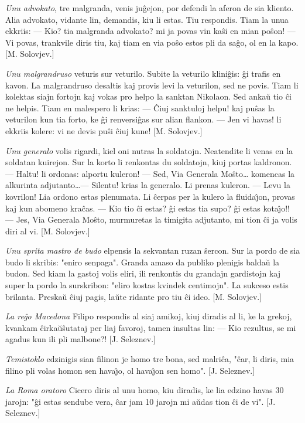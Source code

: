 \emph{Unu advokato}, tre malgranda, venis ju\^gejon, por defendi la
aferon de sia kliento. Alia advokato, vidante lin, demandis, kiu li
estas. Tiu respondis. Tiam la unua ekkriis: --- Kio? tia malgranda
advokato? mi ja povas vin ka\^si en mian po\^son! --- Vi povas,
trankvile diris tiu, kaj tiam en via po\^so estos pli da sa\^go, ol
en la kapo. [M. Solovjev.]

\emph{Unu malgrandruso} veturis sur veturilo. Subite la veturilo
klini\^gis: \^gi trafis en kavon. La malgrandruso desaltis kaj
provis levi la veturilon, sed ne povis. Tiam li kolektas siajn
fortojn kaj vokas pro helpo la sanktan Nikolaon. Sed anka\u u tio
\^ci ne helpis. Tiam en malespero li krias: --- \^Ciuj sanktuloj
helpu! kaj pu\^sas la veturilon kun tia forto, ke \^gi renversi\^gas
sur alian flankon. --- Jen vi havas! li ekkriis kolere: vi ne devis
pu\^si \^ciuj kune! [M. Solovjev.]

\emph{Unu generalo} volis rigardi, kiel oni nutras la soldatojn.
Neatendite li venas en la soldatan kuirejon. Sur la korto li
renkontas du soldatojn, kiuj portas kaldronon. --- Haltu! li
ordonas: alportu kuleron! --- Sed, Via Generala Mo\^sto\dots
komencas la alkurinta adjutanto\dots --- Silentu! krias la generalo.
Li prenas kuleron. --- Levu la kovrilon! Lia ordono estas plenumata.
Li \^cerpas per la kulero la fluida\^{\j}on, provas kaj kun abomeno
kra\^cas. --- Kio tio \^ci estas? \^gi estas tia supo? \^gi estas
kota\^{\j}o!! --- Jes, Via Generala Mo\^sto, murmuretas la timigita
adjutanto, mi tion \^ci ja volis diri al vi. [M. Solovjev.]

\emph{Unu sprita mastro de budo} elpensis la sekvantan ruzan
\^sercon. Sur la pordo de sia budo li skribis: "eniro senpaga".
Granda amaso da publiko plenigis balda\u u la budon. Sed kiam la
gastoj volis eliri, ili renkontis du grandajn gardistojn kaj super
la pordo la surskribon: "eliro kostas kvindek centimojn". La
sukceso estis brilanta. Preska\u u \^ciuj pagis, la\u ute ridante
pro tiu \^ci ideo. [M. Solovjev.]

\emph{La re\^go Macedona} Filipo respondis al siaj amikoj, kiuj
diradis al li, ke la grekoj, kvankam \^cirka\u u\^sutataj per liaj
favoroj, tamen insultas lin: --- Kio rezultus, se mi agadus kun ili
pli malbone?! [J. Seleznev.]

\emph{Temistoklo} edzinigis sian filinon je homo tre bona, sed
malri\^ca, "\^car, li diris, mia filino pli volas homon sen
hava\^{\j}o, ol hava\^{\j}on sen homo". [J. Seleznev.]

\emph{La Roma oratoro} Cicero diris al unu homo, kiu diradis, ke lia
edzino havas 30 jarojn: "\^gi estas sendube vera, \^car jam 10
jarojn mi a\u udas tion \^ci de vi". [J. Seleznev.]

